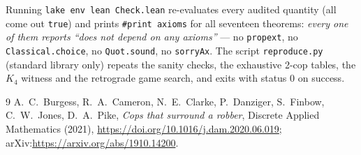 \documentclass[11pt]{article}
\begin{document}
Running \texttt{lake env lean Check.lean} re-evaluates every audited quantity
(all come out \texttt{true}) and prints \texttt{\#print axioms} for all
seventeen theorems: \emph{every one of them reports ``does not depend on any
axioms''} --- no \texttt{propext}, no \texttt{Classical.choice}, no
\texttt{Quot.sound}, no \texttt{sorryAx}.  The script
\texttt{reproduce.py} (standard library only) repeats the sanity checks, the
exhaustive 2-cop tables, the $K_4$ witness and the retrograde game search, and
exits with status $0$ on success.

\begin{thebibliography}{9}
A.~C.~Burgess, R.~A.~Cameron, N.~E.~Clarke, P.~Danziger, S.~Finbow,
C.~W.~Jones, D.~A.~Pike,
\emph{Cops that surround a robber},
Discrete Applied Mathematics (2021),
\url{https://doi.org/10.1016/j.dam.2020.06.019};
arXiv:\url{https://arxiv.org/abs/1910.14200}.
\end{thebibliography}
\end{document}
